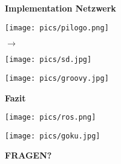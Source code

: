 \documentclass{beamer}
\begin{document}
\begin{frame}
{\bf Implementation Netzwerk}
\parbox{4cm}{\texttt{[image: pics/pilogo.png]}}
\hspace{0.5cm} 
$\rightarrow$
\parbox{4cm}{\texttt{[image: pics/sd.jpg]}}\cite{sd}
\end{frame}


\begin{frame}
\centerline{\texttt{[image: pics/groovy.jpg]}}\cite{groovy}
\end{frame}

\begin{frame}
{\bf Fazit}
\centerline{\texttt{[image: pics/ros.png]}}\cite{ros}
\end{frame}

\begin{frame}
\centerline{\texttt{[image: pics/goku.jpg]}}\cite{goku}
\vspace{2cm}
\centerline{{\bf \Huge FRAGEN?}}
\end{frame}


\end{document}
